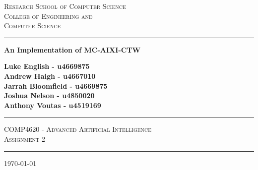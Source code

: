 \documentclass[pdftex,twoside,a4paper]{report}
\begin{document}
\begin{titlepage}
 
\begin{center}

\textsc{\Large Research School of Computer Science}\\[0.5cm]
\textsc{\Large College of Engineering and}\\[0.2cm]
\textsc{\Large Computer Science}\\[0.5cm]


 
\vspace{1.4cm}

\hrule

\vspace{1.4cm}

{ \huge \bfseries An Implementation of MC-AIXI-CTW} \\

\vspace{0.4cm}

{ \bfseries Luke English - u4669875} \\
{ \bfseries Andrew Haigh - u4667010} \\
{ \bfseries Jarrah Bloomfield - u4669875} \\
{ \bfseries Joshua Nelson - u4850020} \\
{ \bfseries Anthony Voutas - u4519169} \\
\vspace{1.4cm}


\hrule

\vspace{1.0cm}

\textsc{\large COMP4620 - Advanced Artificial Intelligence}\\
\textsc{Assignment 2}\\
\vspace{1.0cm}

\hrule

\vspace{1.4cm}

 
\vfill
 
{\large \today}
 
\end{center}
 
\end{titlepage}
\end{document}
